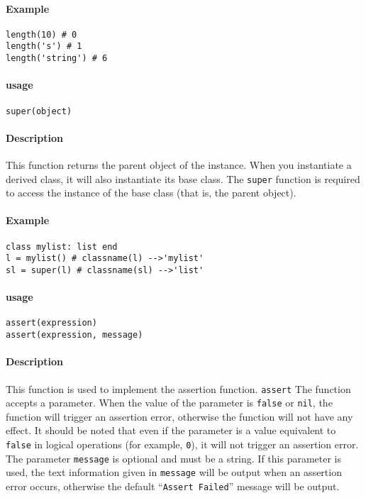 \paragraph{Example}
\begin{lstlisting}[language=berry, numbers=none]
length(10) # 0
length('s') # 1
length('string') # 6
\end{lstlisting}


\paragraph{usage}
\begin{lstlisting}[language=berry, numbers=none]
super(object)
\end{lstlisting}

\paragraph{Description}
This function returns the parent object of the instance. When you instantiate a derived class, it will also instantiate its base class. The \texttt{super} function is required to access the instance of the base class (that is, the parent object).

\paragraph{Example}
\begin{lstlisting}[language=berry, numbers=none]
class mylist: list end
l = mylist() # classname(l) -->'mylist'
sl = super(l) # classname(sl) -->'list'
\end{lstlisting}

\paragraph{usage}
\begin{lstlisting}[language=berry, numbers=none]
assert(expression)
assert(expression, message)
\end{lstlisting}

\paragraph{Description}
This function is used to implement the assertion function. \texttt{assert} The function accepts a parameter. When the value of the parameter is \texttt{false} or \texttt{nil}, the function will trigger an assertion error, otherwise the function will not have any effect. It should be noted that even if the parameter is a value equivalent to \texttt{false} in logical operations (for example, \texttt{0}), it will not trigger an assertion error. The parameter \texttt{message} is optional and must be a string. If this parameter is used, the text information given in \texttt{message} will be output when an assertion error occurs, otherwise the default ``\texttt{Assert Failed}'' message will be output.

